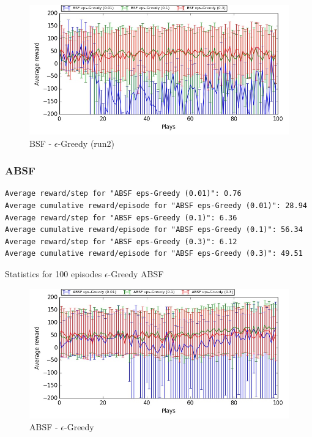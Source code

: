 \documentclass[11pt, a4paper]{article}
\begin{document}
\begin{figure}[H]
\centering
\includegraphics[width=14cm]{BSF_eps_Learning}
\caption{BSF - $\epsilon$-Greedy (run2)}
\end{figure}

\subsubsection*{ABSF}
\begin{listing}
\begin{verbatim}
Average reward/step for "ABSF eps-Greedy (0.01)": 0.76
Average cumulative reward/episode for "ABSF eps-Greedy (0.01)": 28.94
Average reward/step for "ABSF eps-Greedy (0.1)": 6.36
Average cumulative reward/episode for "ABSF eps-Greedy (0.1)": 56.34
Average reward/step for "ABSF eps-Greedy (0.3)": 6.12
Average cumulative reward/episode for "ABSF eps-Greedy (0.3)": 49.51
\end{verbatim}
\caption{Statistics for 100 episodes $\epsilon$-Greedy ABSF}
\end{listing}

\begin{figure}[H]
\centering
\includegraphics[width=14cm]{ABSF_eps_Learning}
\caption{ABSF - $\epsilon$-Greedy}
\end{figure}
\end{document}
